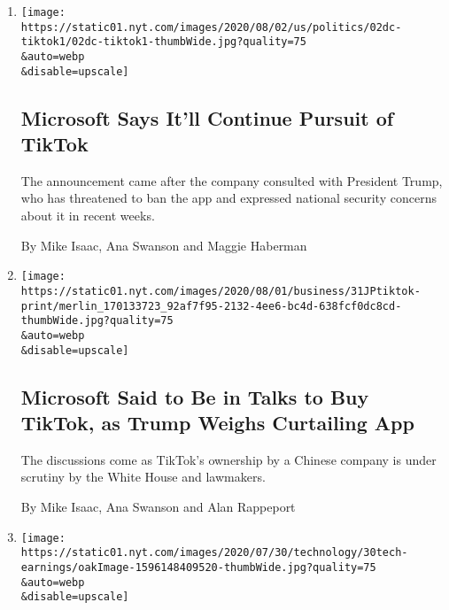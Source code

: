 \begin{enumerate}
\def\labelenumi{\arabic{enumi}.}
\item
  \href{/2020/08/02/business/economy/trump-tiktok-china-national-security.html}{}

  \texttt{[image: https://static01.nyt.com/images/2020/08/02/us/politics/02dc-tiktok1/02dc-tiktok1-thumbWide.jpg?quality=75\\\&auto=webp\\\&disable=upscale]}

  \hypertarget{microsoft-says-itll-continue-pursuit-of-tiktok}{%
  \subsection{Microsoft Says It'll Continue Pursuit of
  TikTok}\label{microsoft-says-itll-continue-pursuit-of-tiktok}}

  The announcement came after the company consulted with President
  Trump, who has threatened to ban the app and expressed national
  security concerns about it in recent weeks.

  By Mike Isaac, Ana Swanson and Maggie Haberman
\item
  \href{/2020/07/31/technology/tiktok-microsoft.html}{}

  \texttt{[image: https://static01.nyt.com/images/2020/08/01/business/31JPtiktok-print/merlin\_170133723\_92af7f95-2132-4ee6-bc4d-638fcf0dc8cd-thumbWide.jpg?quality=75\\\&auto=webp\\\&disable=upscale]}

  \hypertarget{microsoft-said-to-be-in-talks-to-buy-tiktok-as-trump-weighs-curtailing-app}{%
  \subsection{Microsoft Said to Be in Talks to Buy TikTok, as Trump
  Weighs Curtailing
  App}\label{microsoft-said-to-be-in-talks-to-buy-tiktok-as-trump-weighs-curtailing-app}}

  The discussions come as TikTok's ownership by a Chinese company is
  under scrutiny by the White House and lawmakers.

  By Mike Isaac, Ana Swanson and Alan Rappeport
\item
  \href{/live/2020/07/31/business/stock-market-today-coronavirus/the-economy-is-in-record-decline-but-not-for-the-tech-giants}{}

  \texttt{[image: https://static01.nyt.com/images/2020/07/30/technology/30tech-earnings/oakImage-1596148409520-thumbWide.jpg?quality=75\\\&auto=webp\\\&disable=upscale]}

  \hypertarget{the-economy-is-in-record-decline-but-not-for-the-tech-giants}{%
}
\end{enumerate}
